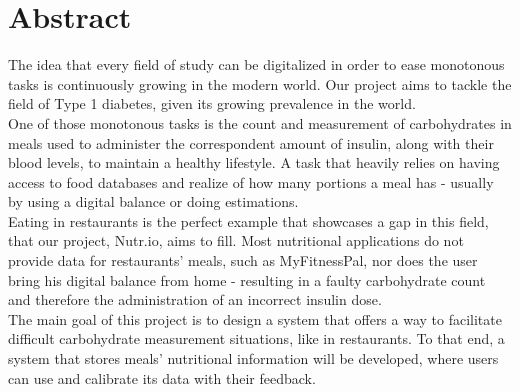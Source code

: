 %
%

\chapter*{Abstract}
    The idea that every field of study can be digitalized in order to ease 
    monotonous tasks is continuously growing in the modern world. Our project
    aims to tackle the field of Type 1 diabetes, given its growing prevalence in the world.\\

    One of those monotonous tasks is the count and measurement of carbohydrates in meals used to
    administer the correspondent amount of insulin, along with their blood levels, to maintain a healthy lifestyle.
    A task that heavily relies on having access to food databases and realize of how many portions a meal has - usually
    by using a digital balance or doing estimations.\\

    Eating in restaurants is the perfect example that showcases a gap in this field, that our project, 
    Nutr.io, aims to fill.  Most nutritional applications do not provide data for restaurants' meals,
    such as MyFitnessPal, nor does the user bring his digital balance from home - resulting in a faulty
    carbohydrate count and therefore the administration of an incorrect insulin dose.\\

    The main goal of this project is to design a system that offers a way to facilitate difficult
    carbohydrate measurement situations, like in restaurants.
    To that end, a system that stores meals' nutritional information will be developed, 
    where users can use and calibrate its data with their feedback.\\